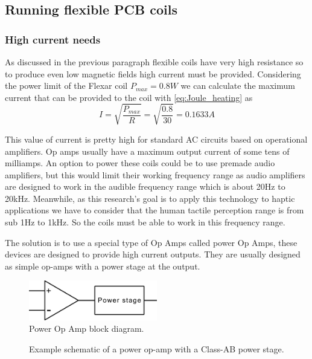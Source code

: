 \subsection{Running flexible PCB coils}

\subsubsection{High current needs}
As discussed in the previous paragraph flexible coils have very high resistance so to produce even low magnetic fields high current must be provided.
Considering the power limit of the Flexar coil $P_{max} = 0.8W$ we can calculate the maximum current that can be provided to the coil with \ref{eq:Joule_heating} as
\begin{equation}
    I = \sqrt{\frac{P_{max}}{R}} = \sqrt{\frac{0.8}{30}} = 0.1633A
\end{equation}

This value of current is pretty high for standard AC circuits based on operational amplifiers.
Op amps usually have a maximum output current of some tens of milliamps.
An option to power these coils could be to use premade audio amplifiers, but this would limit their working frequency range as audio amplifiers are designed to work in the audible frequency range which is about 20Hz to 20kHz.
Meanwhile, as this research's goal is to apply this technology to haptic applications we have to consider that the human tactile perception range is from sub 1Hz to 1kHz. %
So the coils must be able to work in this frequency range.

The solution is to use a special type of Op Amps called power Op Amps, these devices are designed to provide high current outputs.
They are usually designed as simple op-amps with a power stage at the output.
\begin{figure}
    \centering
    \includegraphics[width=0.5\textwidth]{Chapters/Chapter2/Flexible_PCB_Coils/Figures/power_op-amp_block_diagram.png}
    \caption{Power Op Amp block diagram.}
    \label{fig:Power_Op_Amp}
\end{figure}

\begin{figure}
    \vfill
    
    \caption[Power op-amp schematic]{Example schematic of a power op-amp with a Class-AB power stage.}
    \label{fig:Power_op-amp_example}
\end{figure}

